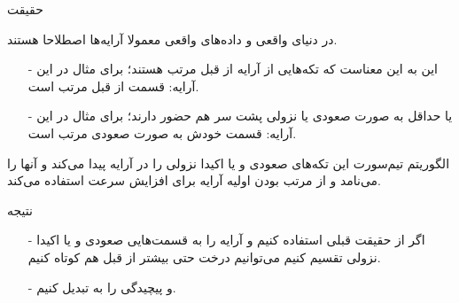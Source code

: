 \begin{frame}{حقیقت}
\begin{center}
{\large در دنیای واقعی و داده‌های واقعی معمولا آرایه‌ها اصطلاحا 
هستند.}
\end{center}
\begin{itemize}\itemr
\item[-]
این به این معناست که تکه‌هایی از آرایه از قبل مرتب هستند؛ برای مثال در این آرایه:
\m{[5, 4, 1, 2, 3]}
قسمت 
\m{[1, 2, 3]}
از قبل مرتب است.
\item[-]
یا حداقل به صورت صعودی یا نزولی پشت سر هم حضور دارند؛ برای مثال در این آرایه:
\m{[6, 4, 1, 2, 3, 5, 7]}
قسمت
\m{[1, 2, 3, 5, 7]}
خودش به صورت صعودی مرتب است.
\end{itemize}

\begin{center}
{\large الگوریتم تیم‌سورت این تکه‌های صعودی و یا اکیدا نزولی را در آرایه پیدا می‌کند و آنها را  می‌نامد و از مرتب بودن اولیه آرایه برای افزایش سرعت استفاده می‌کند.}
\end{center}
\end{frame}

\begin{frame}{نتیجه}
\begin{itemize}\itemr
\item[-]
اگر از حقیقت قبلی استفاده کنیم و آرایه را به قسمت‌هایی صعودی و یا اکیدا نزولی تقسیم کنیم می‌توانیم درخت  حتی بیشتر از قبل هم کوتاه کنیم.

\item[-]
و پیچیدگی را به 
تبدیل کنیم.
\end{itemize}
\end{frame}
